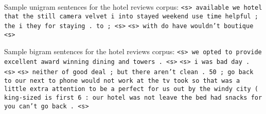 \documentclass{article}
\begin{document}
Sample unigram sentences for the hotel reviews corpus:\npar
\texttt{<s> available we hotel that the still camera velvet i into stayed weekend use time helpful ; the i they for staying . to ; <s>}\npar
\texttt{<s> with do have wouldn't boutique <s>}\npar\bigskip

Sample bigram sentences for the hotel reviews corpus:\npar
\texttt{<s> we opted to provide excellent award winning dining and towers . <s>}\npar
\texttt{<s> i was bad day . <s>}\npar
\texttt{<s> neither of good deal ; but there aren't clean . 50 ; go back to our next to phone would not work at the tv took so that was a little extra attention to be a perfect for us out by the windy city ( king-sized is first 6 : our hotel was not leave the bed had snacks for you can't go back . <s>}
\end{document}

